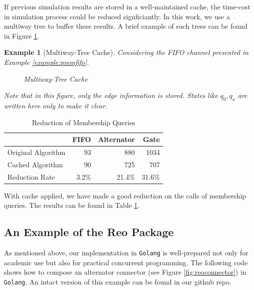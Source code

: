 \documentclass[conference, a4paper]{IEEEtran}
\newtheorem{example}{Example}
\begin{document}
If previous simulation results are stored in a well-maintained cache, the time-cost in
simulation process could be reduced signficiantly. In this work, we use a multiway tree to buffer
these results. A brief example of such trees can be found in Figure \ref{fig:multiway}.

\begin{example}[Multiway-Tree Cache]
  \label{example:tree}
  Considering the FIFO channel presented in Example \ref{example:pmmfifo}. 
  \begin{figure}[h]
    \begin{center}
      
    \end{center}
    \caption{Multiway-Tree Cache}
    \label{fig:multiway}
  \end{figure}
  Note that in this figure, only the edge information is stored. States like $q_0,q_a$ are written
  here only to make it clear.
\end{example}

\begin{table}[h]
  \renewcommand{\arraystretch}{1.3}
  \caption{Reduction of Membership Queries}
  \label{tabel:cacheoptimization}
  \centering
  \begin{tabular}{l||rrr}
    \hline
    & FIFO & Alternator & Gate \\
    \hline\hline
    Original Algorithm & 93 & 880 & 1034 \\
    Cached Algorithm & 90 & 725 & 707 \\
    Reduction Rate & 3.2\% & 21.4\% & 31.6\% \\
    \hline
  \end{tabular}
\end{table}

With cache applied, we have made a good reduction on the calls of membership queries. The results
can be found in Table \ref{tabel:cacheoptimization}.

\subsection{An Example of the Reo Package }
\label{sec:reolib}

As mentioned above, our implementation in \texttt{Golang} is well-prepared not only for academic use
but also for practical concurrent programming. The following code shows how to compose an alternator
connector (see Figure \ref{fig:reoconnector}) in \texttt{Golang}. An intact version of this example can be found in our github repo.
\end{document}
